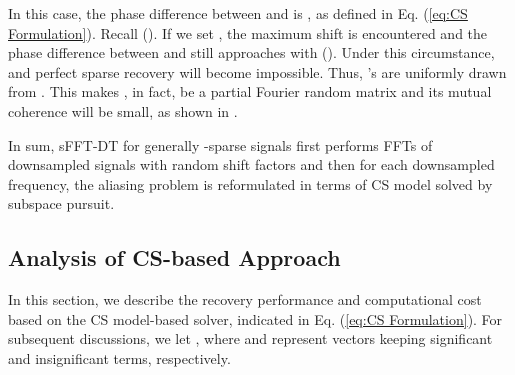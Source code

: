 \documentclass[journal,onecolumn,11pt]{IEEEtran}
\begin{document}
\normalsize
In this case, the phase difference between  and  is , as defined in Eq. (\ref{eq:CS Formulation}).
Recall  ().
If we set , the maximum shift  is encountered and the phase difference between  and  still approaches  with  ().
Under this circumstance,  and perfect sparse recovery will become impossible.
Thus, 's are uniformly drawn from .
This makes , in fact, be a partial Fourier random matrix and its mutual coherence will be small, as shown in \cite{Candes2006-F}.

In sum, sFFT-DT for generally -sparse signals first performs FFTs of downsampled signals with random shift factors and then for each downsampled frequency, the aliasing problem is reformulated in terms of CS model solved by subspace pursuit.

\subsection{Analysis of CS-based Approach}\label{Sec: Analysis CS}
In this section, we describe the recovery performance and computational cost based on the CS model-based solver, indicated in Eq. (\ref{eq:CS Formulation}).
For subsequent discussions, we let , where  and  represent vectors keeping significant and insignificant terms, respectively.
\end{document}
